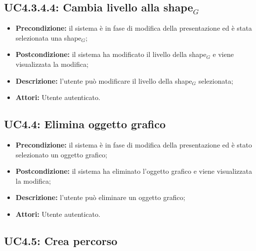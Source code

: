 \subsection{ UC4.3.4.4: Cambia livello alla shape$_G$}

\begin{itemize}
	\item \textbf{Precondizione:} il sistema è in fase di modifica della presentazione ed è stata selezionata una shape$_G$;
	\item \textbf{Postcondizione:} il sistema ha modificato il livello della shape$_G$ e viene visualizzata la modifica;
	\item \textbf{Descrizione:} l'utente può modificare il livello della shape$_G$ selezionata;
	\item \textbf{Attori:} Utente autenticato.
\end{itemize}
\subsection{ UC4.4: Elimina oggetto grafico}

\begin{itemize}
	\item \textbf{Precondizione:} il sistema è in fase di modifica della presentazione ed è stato selezionato un oggetto grafico;
	\item \textbf{Postcondizione:} il sistema ha eliminato l'oggetto grafico e viene visualizzata la modifica;
	\item \textbf{Descrizione:} l'utente può eliminare un oggetto grafico;
	\item \textbf{Attori:} Utente autenticato.
\end{itemize}
\subsection{ UC4.5: Crea percorso}

